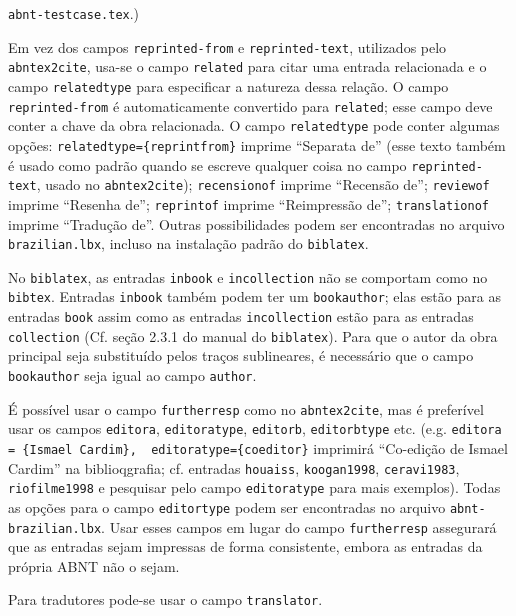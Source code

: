 \documentclass[a4paper]{article}
\begin{document}
\begin{itemize}
\begin{sloppypar}
      \texttt{abnt-testcase.tex}.)
    \item Em vez dos campos \texttt{reprinted-from} e \texttt{reprinted-text},
      utilizados pelo \texttt{abntex2cite}, usa-se o campo \texttt{related}
      para citar uma entrada relacionada e o campo \texttt{relatedtype} para
      especificar a natureza dessa relação. O campo \texttt{reprinted-from}
      é automaticamente convertido para \texttt{related}; esse campo deve
      conter a chave da obra relacionada. O campo \texttt{relatedtype} pode
      conter algumas opções: \texttt{relatedtype=\{reprintfrom\}} imprime
      ``Separata de'' (esse texto também é usado como padrão quando se escreve
      qualquer coisa no campo \texttt{reprinted-text}, usado no
      \texttt{abntex2cite}); \texttt{recensionof} imprime ``Recensão de'';
      \texttt{reviewof} imprime ``Resenha de''; \texttt{reprintof} imprime
      ``Reimpressão de''; \texttt{translationof} imprime ``Tradução de''.
      Outras possibilidades podem ser encontradas no arquivo
      \texttt{brazilian.lbx}, incluso na instalação padrão do
      \texttt{biblatex}.
    \item No \texttt{biblatex}, as entradas \texttt{inbook}
      e \texttt{incollection} não se comportam como no \texttt{bibtex}.
      Entradas \texttt{inbook} também podem ter um \texttt{bookauthor}; elas
      estão para as entradas \texttt{book} assim como as entradas
      \texttt{incollection} estão para as entradas \texttt{collection} (Cf.
      seção 2.3.1 do manual do \texttt{biblatex}). Para que o autor da obra
      principal seja substituído pelos traços sublineares, é necessário que
      o campo \texttt{bookauthor} seja igual ao campo \texttt{author}.
    \item É possível usar o campo \texttt{furtherresp} como no
      \texttt{abntex2cite}, mas é preferível usar os campos \texttt{editora},
      \texttt{editoratype}, \texttt{editorb}, \texttt{editorbtype} etc. (e.g.
      \verb"editora = {Ismael Cardim},  editoratype={coeditor}" imprimirá
      ``Co-edição de Ismael Cardim'' na biblioqgrafia; cf. entradas
      \texttt{hou\-a\-iss}, \texttt{koogan1998}, \texttt{ceravi1983},
      \texttt{riofilme1998} e pesquisar pelo campo \texttt{editor\-a\-type}
      para mais exemplos). Todas as opções para o campo \texttt{editor\-type}
      podem ser encontradas no arquivo \texttt{abnt-brazilian.lbx}. Usar esses
      campos em lugar do campo \texttt{furtherresp} assegurará que as entradas
      sejam impressas de forma consistente, embora as entradas da própria ABNT
      não o sejam.
    \item Para tradutores pode-se usar o campo \texttt{translator}.
\end{sloppypar}
\end{itemize}

\clearpage
\nocite{*}
\printbibliography
\end{document}
